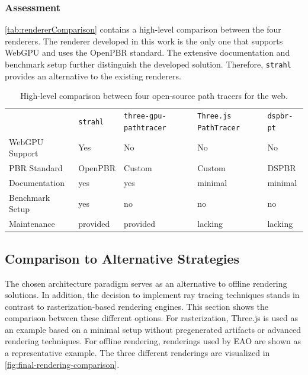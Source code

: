 \subsubsection*{Assessment}

\autoref{tab:rendererComparison} contains a high-level comparison between the four renderers. The renderer developed in this work is the only one that supports \gls{WebGPU} and uses the \gls{OpenPBR} standard. The extensive documentation and benchmark setup further distinguish the developed solution. Therefore, \texttt{strahl} provides an alternative to the existing renderers.

\begin{table}[H]
    \centering
    \begin{tabular}{@{}p{3cm}p{1.9cm}p{2.8cm}p{3.2cm}p{2.4cm}@{}}
    \toprule
     & \texttt{strahl} & \texttt{three-gpu-} \texttt{pathtracer} \cite{ThreeJsPathTracerJohnson} & \texttt{Three.js PathTracer} \cite{ThreeJsPathTracerLoftis} & \texttt{dspbr-pt} \cite{PathTracerDassault} \\
    \gls{WebGPU} \newline Support & Yes & No & No & No \\
    \gls{PBR} Standard & \gls{OpenPBR} & Custom & Custom & \gls{DSPBR} \\
    Documentation & yes & yes & minimal & minimal \\
    Benchmark Setup & yes & no & no & no \\
    Maintenance & provided & provided & lacking & lacking \\
    \bottomrule
    \end{tabular}
    \caption{High-level comparison between four open-source path tracers for the web.}
    \label{tab:rendererComparison}
  \end{table}

\subsection*{Comparison to Alternative Strategies}

The chosen architecture paradigm serves as an alternative to offline rendering solutions. In addition, the decision to implement ray tracing techniques stands in contrast to rasterization-based rendering engines. This section shows the comparison between these different options. For rasterization, \gls{Three.js} is used as an example based on a minimal setup without pregenerated artifacts or advanced rendering techniques. For offline rendering,  renderings used by EAO are shown as a representative example. The three different renderings are visualized in \autoref{fig:final-rendering-comparison}.

